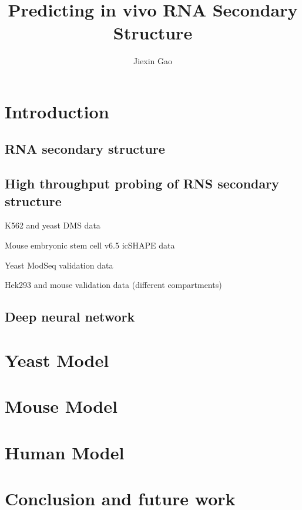 \documentclass{proposal}
\author{Jiexin Gao}
\title{Predicting in vivo RNA Secondary Structure}
\begin{document}
\begin{preliminary}

\maketitle

\begin{abstract}



\end{abstract}

\tableofcontents

\end{preliminary}





\chapter{Introduction}

\section{RNA secondary structure}


\section{High throughput probing of RNS secondary structure}

K562 and yeast DMS data\cite{rouskin2014genome}

Mouse embryonic stem cell v6.5 icSHAPE data\cite{spitale2015structural}

Yeast ModSeq validation data\cite{talkish2014mod}

Hek293 and mouse validation data (different compartments)\cite{sun2019rna}



\section{Deep neural network}

\chapter{Yeast Model}

\chapter{Mouse Model}


\chapter{Human Model}

\chapter{Conclusion and future work}



\end{document}
